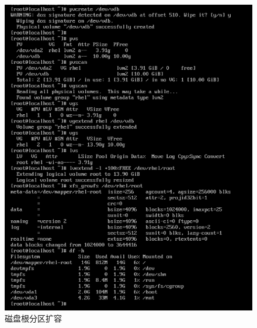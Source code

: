 \begin{figure}[H]
  \centering
  \includegraphics[scale=0.3]{extendlvm.png}
  \caption{磁盘根分区扩容}
  \label{fig:extendlvm}
\end{figure}
